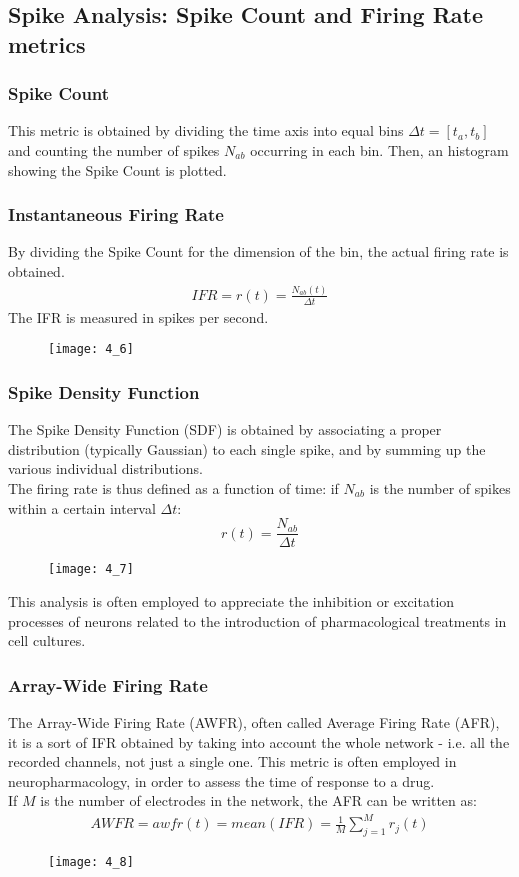 \subsection{Spike Analysis: Spike Count and Firing Rate metrics}
\subsubsection{Spike Count}
This metric is obtained by dividing the time axis into equal bins \(\Delta{t}=[t_a,t_b]\)
and counting the number of spikes \(N_{ab}\) occurring in each bin. Then, an histogram
showing the Spike Count is plotted.
\subsubsection{Instantaneous Firing Rate}
By dividing the Spike Count for the dimension of the bin, the actual firing rate is obtained.
\begin{align*}
    IFR=r(t)=\frac{N_{ab}(t)}{\Delta{t}}
\end{align*}
The IFR is measured in spikes per second.
\begin{figure}[H]
    \texttt{[image: 4\_6]}
    \centering
\end{figure}
\subsubsection{Spike Density Function}
The Spike Density Function (SDF) is obtained by associating a proper distribution
(typically Gaussian) to each single spike, and by summing up the various individual
distributions.\\
The firing rate is thus defined as a function of time: if \(N_{ab}\) is the number of spikes
within a certain interval \(\Delta t\):
\begin{equation*}
    r(t)=\frac{N_{ab}}{\Delta t}
\end{equation*}
\begin{figure}[H]
    \texttt{[image: 4\_7]}
    \centering
\end{figure}
This analysis is often employed to appreciate the inhibition or excitation processes of
neurons related to the introduction of pharmacological treatments in cell cultures.
\subsubsection{Array-Wide Firing Rate}
The Array-Wide Firing Rate (AWFR), often called Average Firing Rate (AFR), it is a sort of
IFR obtained by taking into account the whole network - i.e. all the recorded channels,
not just a single one. This metric is often employed in neuropharmacology, in order to
assess the time of response to a drug.\\
If \(M\) is the number of electrodes in the network, the AFR can be written as:
\begin{align*}
    AWFR=awfr(t)=mean(IFR)=\frac{1}{M}\sum_{j=1}^{M}r_{j}(t)
\end{align*}
\begin{figure}[H]
    \texttt{[image: 4\_8]}
    \centering
\end{figure}
